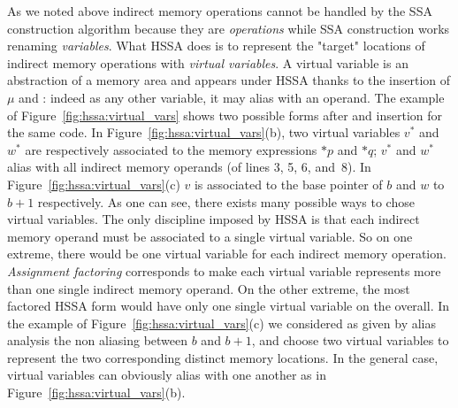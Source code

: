 As we noted above indirect memory operations cannot be handled by the SSA construction algorithm because they are {\em operations} while SSA construction works renaming {\em variables}.
What HSSA does is to represent the "target" locations of indirect memory operations with {\em virtual variables}. A virtual variable is an abstraction of a memory area and appears under HSSA thanks to the insertion of $\mu$ and \phifuns: indeed as any other variable, it may alias with an operand. The example of Figure~\ref{fig:hssa:virtual_vars} shows two possible forms after \mufun and \chifun insertion for the same code. In Figure~\ref{fig:hssa:virtual_vars}(b), two virtual variables $v^*$ and $w^*$ are respectively associated to the memory expressions $*p$ and $*q$; $v^*$ and $w^*$ alias with all indirect memory operands (of lines 3, 5, 6, and~8). In Figure~\ref{fig:hssa:virtual_vars}(c) $v$ is associated to the base pointer of $b$ and $w$ to $b+1$ respectively. As one can see, there exists many possible ways to chose virtual variables. The only discipline imposed by HSSA is that each indirect memory operand must be associated to a single virtual variable. So on one extreme, there would be one virtual variable for each indirect memory operation. \emph{Assignment factoring} corresponds to make each virtual variable represents more than one single indirect memory operand. On the other extreme, the most factored HSSA form would have only one single virtual variable on the overall. In the example of Figure~\ref{fig:hssa:virtual_vars}(c) we considered as given by alias analysis the non aliasing between $b$ and $b+1$, and choose two virtual variables to represent the two corresponding distinct memory locations. In the general case, virtual variables can obviously alias with one another as in Figure~\ref{fig:hssa:virtual_vars}(b).

